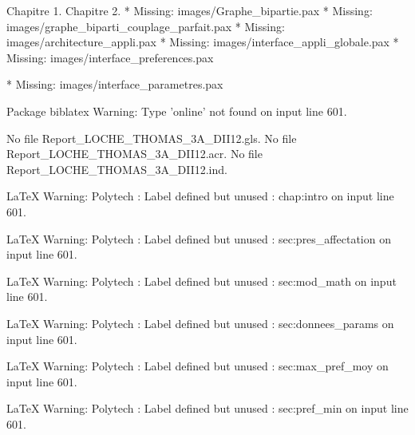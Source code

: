 Chapitre 1.
Chapitre 2.
* Missing: images/Graphe_bipartie.pax
* Missing: images/graphe_biparti_couplage_parfait.pax
* Missing: images/architecture_appli.pax
* Missing: images/interface_appli_globale.pax
* Missing: images/interface_preferences.pax

* Missing: images/interface_parametres.pax

Package biblatex Warning: Type 'online' not found on input line 601.

No file Report_LOCHE_THOMAS_3A_DII12.gls.
No file Report_LOCHE_THOMAS_3A_DII12.acr.
No file Report_LOCHE_THOMAS_3A_DII12.ind.

LaTeX Warning: Polytech : Label defined but unused : chap:intro on input line 601.


LaTeX Warning: Polytech : Label defined but unused : sec:pres_affectation on input line 601.


LaTeX Warning: Polytech : Label defined but unused : sec:mod_math on input line 601.


LaTeX Warning: Polytech : Label defined but unused : sec:donnees_params on input line 601.


LaTeX Warning: Polytech : Label defined but unused : sec:max_pref_moy on input line 601.


LaTeX Warning: Polytech : Label defined but unused : sec:pref_min on input line 601.





